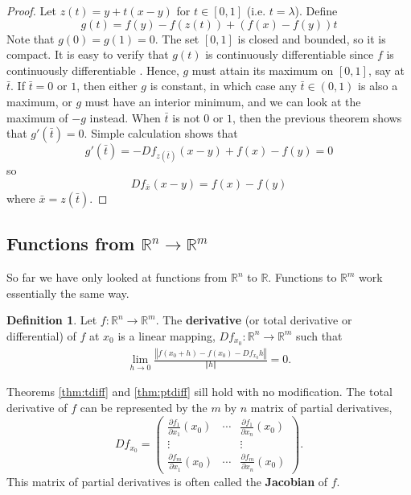 \documentclass[12pt,reqno]{amsart}
\theoremstyle{definition}
\newtheorem{definition}{Definition}[section]
\def\R{\mathbb{R}}
\newcommand{\norm}[1]{\left\Vert {#1} \right\Vert}
\renewcommand{\to}{{\rightarrow}}
\begin{document}
\begin{proof}
  Let $z(t) = y + t(x-y)$ for $t \in [0,1]$ (i.e.
  $t=\lambda$). Define
  \[ g(t) = f(y) - f(z(t)) + \left(f(x) - f(y)\right) t \] Note that
  $g(0) = g(1) = 0$. The set $[0,1]$ is closed and bounded, so it is
  compact. It is easy to verify that $g(t)$ is continuously
  differentiable since $f$ is continuously differentiable . Hence, $g$
  must attain its maximum on $[0,1]$, say at $\bar{t}$. If $\bar{t} =
  0$ or $1$, then either $g$ is constant, in which case any $\bar{t}
  \in (0,1)$ is also a maximum, or $g$ must have an interior minimum,
  and we can look at the maximum of $-g$ instead. When $\bar{t}$ is
  not $0$ or $1$, then the previous theorem shows that $g'(\bar{t}) =
  0$. Simple calculation shows that
  \[ g'(\bar{t}) = -Df_{z(\bar{t})} (x-y) +  f(x) - f(y) = 0 \]
  so 
  \[ Df_{\bar{x}}(x-y) = f(x) - f(y) \]
  where $\bar{x} = z(\bar{t})$.
\end{proof}

\subsection{Functions from $\R^n \to \R^m$}

So far we have only looked at functions from $\R^n$ to $\R$. Functions
to $\R^m$ work essentially the same way. 
\begin{definition}
  Let $f: \R^n \to \R^m$. The \textbf{derivative} (or total derivative
  or differential) of $f$ at $x_0$ is a linear mapping, $Df_{x_0}:
  \R^n \to \R^m$ such that
  \begin{align*}
    \lim_{h \to 0} \frac{\left\Vert f(x_0 + h) - f(x_0) - Df_{x_0}
        h\right\Vert} {\norm{h}} = 0. 
  \end{align*}
\end{definition}
Theorems \ref{thm:tdiff} and \ref{thm:ptdiff} sill hold with no
modification. The total derivative of $f$ can be represented by the
$m$ by $n$ matrix of partial derivatives,
\[ Df_{x_0}  = \begin{pmatrix} \frac{\partial f_1}{\partial x_1}(x_0) &
  \cdots & \frac{\partial f_1}{\partial x_n}(x_0) \\
  \vdots & & \vdots \\
  \frac{\partial f_m}{\partial x_1}(x_0) & \cdots & \frac{\partial
    f_m}{\partial x_n}(x_0)  
\end{pmatrix}. \] 
This matrix of partial derivatives is often called
the \textbf{Jacobian} of $f$. 
\end{document}
